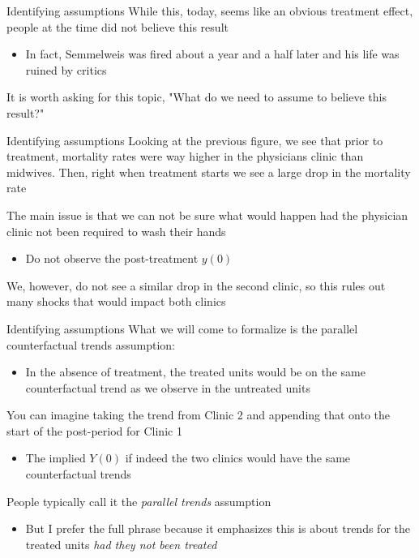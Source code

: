 \documentclass[aspectratio=169,t,11pt,table]{beamer}
\begin{document}

\begin{frame}{Identifying assumptions}
  While this, today, seems like an obvious treatment effect, people at the time did not believe this result
  \begin{itemize}
    \item In fact, Semmelweis was fired about a year and a half later and his life was ruined by critics
  \end{itemize}

  \bigskip
  It is worth asking for this topic, "What do we need to assume to believe this result?"
\end{frame}

\begin{frame}{Identifying assumptions}
  Looking at the previous figure, we see that prior to treatment, mortality rates were way higher in the physicians clinic than midwives.
  Then, right when treatment starts we see a large drop in the mortality rate
  
  \bigskip
  The main issue is that we can not be sure what would happen had the physician clinic not been required to wash their hands
  \begin{itemize}
    \item Do not observe the post-treatment $y(0)$
  \end{itemize}

  \pause
  \bigskip
  We, however, do not see a similar drop in the second clinic, so this rules out many shocks that would impact both clinics
\end{frame}

\begin{frame}{Identifying assumptions}
  What we will come to formalize is the \alert{parallel counterfactual trends} assumption:
  \begin{itemize}
    \item In the absence of treatment, the treated units would be on the same counterfactual trend as we observe in the untreated units
  \end{itemize}

  \bigskip
  You can imagine taking the trend from Clinic 2 and appending that onto the start of the post-period for Clinic 1
  \begin{itemize}
    \item The implied $Y(0)$ if indeed the two clinics would have the same counterfactual trends
  \end{itemize}

  \bigskip
  People typically call it the \emph{parallel trends} assumption
  \begin{itemize}
    \item But I prefer the full phrase because it emphasizes this is about trends for the treated units \emph{had they not been treated}
  \end{itemize}
\end{frame}
\end{document}
